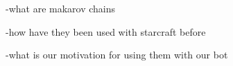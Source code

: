 -what are makarov chains

-how have they been used with starcraft before

-what is our motivation for using them with our bot